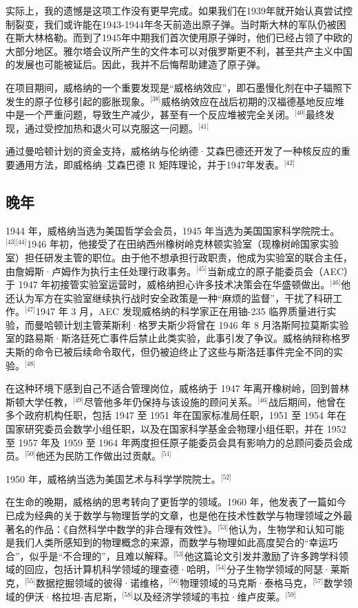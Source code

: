 实际上，我的遗憾是这项工作没有更早完成。如果我们在1939年就开始认真尝试控制裂变，我们或许能在1943-1944年冬天前造出原子弹。当时斯大林的军队仍被困在斯大林格勒。而到了1945年中期我们首次使用原子弹时，他们已经占领了中欧的大部分地区。雅尔塔会议所产生的文件本可以对俄罗斯更不利，甚至共产主义中国的发展也可能被延后。因此，我并不后悔帮助建造了原子弹。

在项目期间，威格纳的一个重要发现是“威格纳效应”，即石墨慢化剂在中子辐照下发生的原子位移引起的膨胀现象。\(^\text{[38]}\)威格纳效应在战后初期的汉福德基地反应堆中是一个严重问题，导致生产减少，甚至有一个反应堆被完全关闭。\(^\text{[40]}\)最终发现，通过受控加热和退火可以克服这一问题。\(^\text{[41]}\)

通过曼哈顿计划的资金支持，威格纳与伦纳德·艾森巴德还开发了一种核反应的重要通用方法，即威格纳–艾森巴德 R 矩阵理论，并于1947年发表。\(^\text{[42]}\)
\subsection{晚年}
1944 年，威格纳当选为美国哲学会会员，1945 年当选为美国国家科学院院士。\(^\text{[43][44]}\)1946 年初，他接受了在田纳西州橡树岭克林顿实验室（现橡树岭国家实验室）担任研发主管的职位。由于他不想承担行政职责，他成为实验室的联合主任，由詹姆斯·卢姆作为执行主任处理行政事务。\(^\text{[45]}\)当新成立的原子能委员会（AEC）于 1947 年初接管实验室运营时，威格纳担心许多技术决策会在华盛顿做出。\(^\text{[46]}\)他还认为军方在实验室继续执行战时安全政策是一种“麻烦的监督”，干扰了科研工作。\(^\text{[47]}\)1947 年 3 月，AEC 发现威格纳的科学家正在用铀-235 临界质量进行实验，而曼哈顿计划主管莱斯利·格罗夫斯少将曾在 1946 年 8 月洛斯阿拉莫斯实验室的路易斯·斯洛廷死亡事件后禁止此类实验，此事引发了争议。威格纳辩称格罗夫斯的命令已被后续命令取代，但仍被迫终止了这些与斯洛廷事件完全不同的实验。\(^\text{[48]}\)

在这种环境下感到自己不适合管理岗位，威格纳于 1947 年离开橡树岭，回到普林斯顿大学任教，\(^\text{[49]}\)尽管他多年仍保持与该设施的顾问关系。\(^\text{[46]}\)战后期间，他曾在多个政府机构任职，包括 1947 至 1951 年在国家标准局任职，1951 至 1954 年在国家研究委员会数学小组任职，以及在国家科学基金会物理小组任职，并在 1952 至 1957 年及 1959 至 1964 年两度担任原子能委员会具有影响力的总顾问委员会成员。\(^\text{[50]}\)他还为民防工作做出过贡献。\(^\text{[51]}\)

1950 年，威格纳当选为美国艺术与科学学院院士。\(^\text{[52]}\)

在生命的晚期，威格纳的思考转向了更哲学的领域。1960 年，他发表了一篇如今已成为经典的关于数学与物理哲学的文章，也是他在技术性数学与物理领域之外最著名的作品：《自然科学中数学的非合理有效性》。\(^\text{[53]}\)他认为，生物学和认知可能是我们人类所感知到的物理概念的来源，而数学与物理如此高度契合的“幸运巧合”，似乎是“不合理的”，且难以解释。\(^\text{[53]}\)他这篇论文引发并激励了许多跨学科领域的回应，包括计算机科学领域的理查德·哈明，\(^\text{[54]}\)分子生物学领域的阿瑟·莱斯克，\(^\text{[55]}\)数据挖掘领域的彼得·诺维格，\(^\text{[56]}\)物理领域的马克斯·泰格马克，\(^\text{[57]}\)数学领域的伊沃·格拉坦-吉尼斯，\(^\text{[58]}\)以及经济学领域的韦拉·维卢皮莱。\(^\text{[59]}\)

